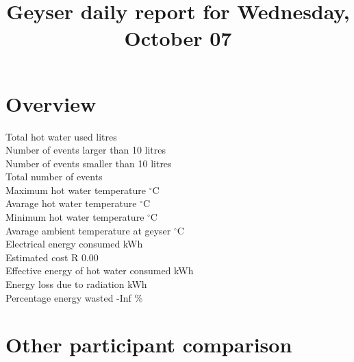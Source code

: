 \documentclass{article}\usepackage[]{graphicx}\usepackage[]{color}
\title{Geyser daily report for Wednesday, October 07} %
\date{\vspace{-5ex}} %
\begin{document}
\maketitle %






\section{Overview}



Total hot water used  litres\\
Number of events larger than 10 litres \\
Number of events smaller than 10 litres \\
Total number of events \\

Maximum hot water temperature  $^{\circ}$C\\
Avarage hot water temperature  $^{\circ}$C\\
Minimum hot water temperature  $^{\circ}$C\\
Avarage ambient temperature at geyser  $^{\circ}$C\\

Electrical energy consumed  kWh\\
Estimated cost \dotfill  R 0.00\\
Effective energy of hot water consumed  kWh\\
Energy loss due to radiation  kWh\\
Percentage energy wasted \dotfill   -Inf \%\\



\section{Other participant comparison}
\end{document}
